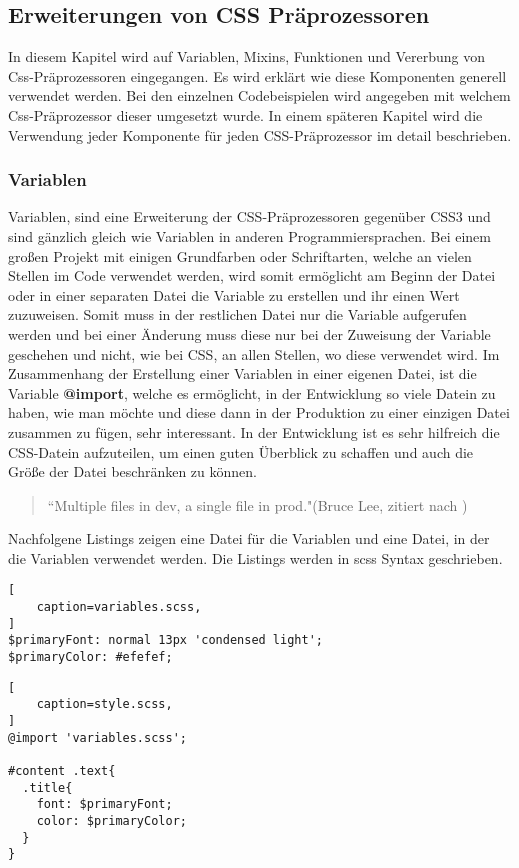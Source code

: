 \subsection{Erweiterungen von CSS Präprozessoren}
In diesem Kapitel wird auf Variablen, Mixins, Funktionen und Vererbung von Css-Präprozessoren eingegangen. Es wird erklärt wie diese Komponenten generell verwendet werden. Bei den einzelnen Codebeispielen wird angegeben mit welchem Css-Präprozessor dieser umgesetzt wurde. In einem späteren Kapitel wird die Verwendung jeder Komponente für jeden CSS-Präprozessor im detail beschrieben.
\subsubsection{Variablen}
Variablen, sind eine Erweiterung der CSS-Präprozessoren gegenüber CSS3 und sind gänzlich gleich wie Variablen in anderen Programmiersprachen.
Bei einem großen Projekt mit einigen Grundfarben oder Schriftarten, welche an vielen Stellen im Code verwendet werden, wird somit ermöglicht am Beginn der Datei oder in einer separaten Datei die Variable zu erstellen und ihr einen Wert zuzuweisen. Somit muss in der restlichen Datei nur die Variable aufgerufen werden und bei einer Änderung muss diese nur bei der Zuweisung der Variable geschehen und nicht, wie bei CSS, an allen Stellen, wo diese verwendet wird.\autocite[]{Yard.2014} \newline
Im Zusammenhang der Erstellung einer Variablen in einer eigenen Datei, ist die Variable \textbf{@import}, welche es ermöglicht, in der Entwicklung so viele Datein zu haben, wie man möchte und diese dann in der Produktion zu einer einzigen Datei zusammen zu fügen, sehr interessant\autocite[]{Giraudel.2014}.\newline
In der Entwicklung ist es sehr hilfreich die CSS-Datein aufzuteilen, um einen guten Überblick zu schaffen und auch die Größe der Datei beschränken zu können.
\begin{quote}
``Multiple files in dev, a single file in prod."(Bruce Lee, zitiert nach \cite[]{Giraudel.2014})
\end{quote}

Nachfolgene Listings zeigen eine Datei für die Variablen und eine Datei, in der die Variablen verwendet werden. Die Listings werden in scss Syntax geschrieben.
\begin{lstlisting}[
	caption=variables.scss,
]
$primaryFont: normal 13px 'condensed light';
$primaryColor: #efefef;
\end{lstlisting}
\begin{lstlisting}[
	caption=style.scss,
]
@import 'variables.scss';

#content .text{
  .title{
    font: $primaryFont;
    color: $primaryColor;
  }
}
\end{lstlisting}

